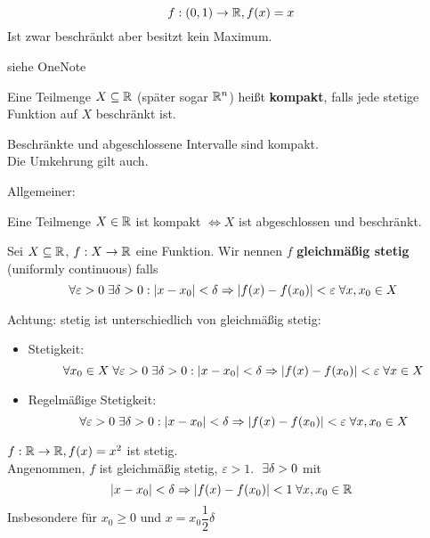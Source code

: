 \documentclass[main.tex]{subfiles}
\begin{document}
\begin{Beispiel}[Gegenbeispiel]
  $$f:(0,1)\to \mathbb{R}, f(x) = x$$
  Ist zwar beschränkt aber besitzt kein Maximum.
\end{Beispiel}

\begin{Beweis}
  siehe OneNote
\end{Beweis}

\begin{Bemerkung}[Vorausschau]
  \begin{Definition}
    Eine Teilmenge $X \subseteq \mathbb{R}$ (später sogar $\mathbb{R}^n$) heißt \textbf{kompakt}, falls jede stetige Funktion auf $X$ beschränkt ist.
  \end{Definition}
  \begin{Theorem}
    Beschränkte und abgeschlossene Intervalle sind kompakt.\\
    Die Umkehrung gilt auch.
  \end{Theorem}
  Allgemeiner:
  \begin{Theorem}
    Eine Teilmenge $X \in \mathbb{R}$ ist kompakt $\Leftrightarrow X$ ist abgeschlossen und beschränkt.
  \end{Theorem}
\end{Bemerkung}

\begin{Definition}
  Sei $X \subseteq \mathbb{R}$, $f: X \to \mathbb{R}$ eine Funktion. Wir nennen $f$ \textbf{gleichmäßig stetig} (uniformly continuous) falls
  $$\;\forall \varepsilon > 0 \;\exists \delta > 0 : |x - x_0| < \delta \Rightarrow |f(x)-f(x_0)| < \varepsilon \;\forall x,x_0 \in X$$
\end{Definition}

\begin{Bemerkung}
  Achtung: stetig ist unterschiedlich von gleichmäßig stetig:
  \begin{itemize}
    \item Stetigkeit:
      $$\;\forall x_0 \in X \;\forall \varepsilon > 0 \;\exists \delta > 0 : |x - x_0| < \delta \Rightarrow |f(x)-f(x_0)| < \varepsilon \;\forall x \in X$$
    \item Regelmäßige Stetigkeit:
      $$\;\forall \varepsilon > 0 \;\exists \delta > 0 : |x - x_0| < \delta \Rightarrow |f(x)-f(x_0)| < \varepsilon \;\forall x,x_0 \in X$$
  \end{itemize}
\end{Bemerkung}

\begin{Beispiel}
  $f:\mathbb{R} \to \mathbb{R}, f(x)=x^2$ ist stetig.\\
  Angenommen, $f$ ist gleichmäßig stetig, $\varepsilon > 1$. $\;\exists \delta > 0$ mit
  $$|x - x_0| < \delta \Rightarrow |f(x)-f(x_0)| < 1 \;\forall x,x_0 \in \mathbb{R}$$
  Insbesondere für $x_0 \geq 0$ und $x = x_0 \dfrac{1}{2}\delta$
\end{Beispiel}
\end{document}
